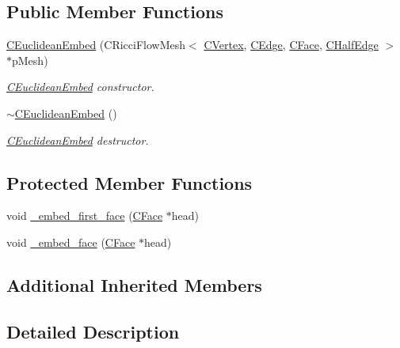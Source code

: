 \subsection*{Public Member Functions}
\begin{DoxyCompactItemize}
\item 
\hyperlink{class_mesh_lib_1_1_c_euclidean_embed_aaa1fcdae94b0186ceece3120d85e4520}{C\+Euclidean\+Embed} (C\+Ricci\+Flow\+Mesh$<$ \hyperlink{class_mesh_lib_1_1_c_vertex}{C\+Vertex}, \hyperlink{class_mesh_lib_1_1_c_edge}{C\+Edge}, \hyperlink{class_mesh_lib_1_1_c_face}{C\+Face}, \hyperlink{class_mesh_lib_1_1_c_half_edge}{C\+Half\+Edge} $>$ $\ast$p\+Mesh)
\begin{DoxyCompactList}\small\item\em \hyperlink{class_mesh_lib_1_1_c_euclidean_embed}{C\+Euclidean\+Embed} constructor. \end{DoxyCompactList}\item 
\hyperlink{class_mesh_lib_1_1_c_euclidean_embed_a6a4f24375f7c0cb1fce89dedef808605}{$\sim$\+C\+Euclidean\+Embed} ()
\begin{DoxyCompactList}\small\item\em \hyperlink{class_mesh_lib_1_1_c_euclidean_embed}{C\+Euclidean\+Embed} destructor. \end{DoxyCompactList}\end{DoxyCompactItemize}
\subsection*{Protected Member Functions}
\begin{DoxyCompactItemize}
\item 
void \hyperlink{class_mesh_lib_1_1_c_euclidean_embed_a6910ac47a9c2b101b8dca4049a533141}{\+\_\+embed\+\_\+first\+\_\+face} (\hyperlink{class_mesh_lib_1_1_c_face}{C\+Face} $\ast$head)
\item 
void \hyperlink{class_mesh_lib_1_1_c_euclidean_embed_aa77b6c218a33dbb01bc1eb5aad444c32}{\+\_\+embed\+\_\+face} (\hyperlink{class_mesh_lib_1_1_c_face}{C\+Face} $\ast$head)
\end{DoxyCompactItemize}
\subsection*{Additional Inherited Members}


\subsection{Detailed Description}
